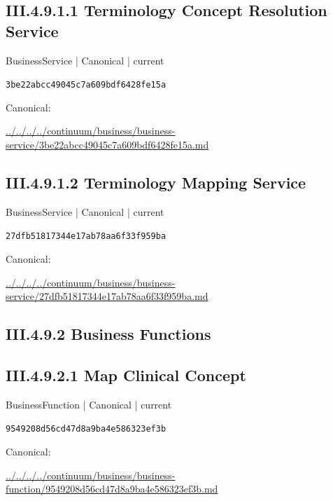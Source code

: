 \documentclass[10pt,a4paper]{article}
\begin{document}
\subsection*{III.4.9.1.1 Terminology Concept Resolution Service}
{\small BusinessService | Canonical | current}\par
\texttt{3be22abcc49045c7a609bdf6428fe15a}\par
Canonical: \par
{\footnotesize\url{../../../../continuum/business/business-service/3be22abcc49045c7a609bdf6428fe15a.md}}\par
\subsection*{III.4.9.1.2 Terminology Mapping Service}
{\small BusinessService | Canonical | current}\par
\texttt{27dfb51817344e17ab78aa6f33f959ba}\par
Canonical: \par
{\footnotesize\url{../../../../continuum/business/business-service/27dfb51817344e17ab78aa6f33f959ba.md}}\par
\subsection*{III.4.9.2 Business Functions}
\subsection*{III.4.9.2.1 Map Clinical Concept}
{\small BusinessFunction | Canonical | current}\par
\texttt{9549208d56cd47d8a9ba4e586323ef3b}\par
Canonical: \par
{\footnotesize\url{../../../../continuum/business/business-function/9549208d56cd47d8a9ba4e586323ef3b.md}}\par
\end{document}
